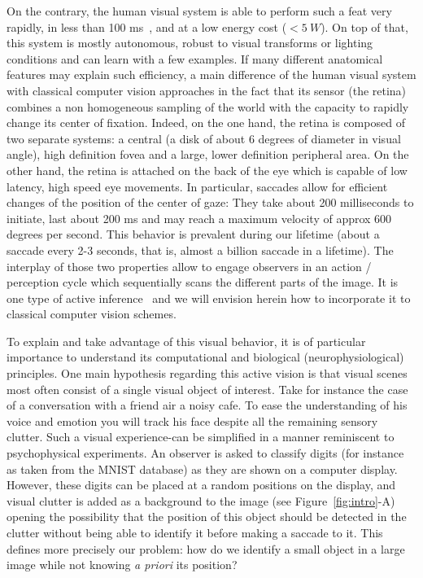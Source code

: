 On the contrary, the human visual system is able to perform such a feat very rapidly, in less than 100 ms~\citep{Kirchner06}, and at a low energy cost ($<5~W$). On top of that, this system is mostly autonomous, robust to visual transforms or lighting conditions and can learn with a few examples. If many different anatomical features may explain such efficiency, a main difference of the human visual system with classical computer vision approaches in the fact that its sensor (the retina) combines a non homogeneous sampling of the world with the capacity to rapidly change its center of fixation. Indeed, on the one hand, the retina is composed of two separate systems: a central (a disk of about 6 degrees of diameter in visual angle), high definition fovea and a large, lower definition peripheral area. On the other hand, the retina is attached on the back of the eye which is capable of low latency, high speed eye movements. In particular, saccades allow for efficient changes of the position of the center of gaze: They take about 200 milliseconds to initiate, last about 200 ms and may reach a maximum velocity of approx 600 degrees per second. This behavior is prevalent during our lifetime (about a saccade every 2-3 seconds, that is, almost a billion saccade in a lifetime). The interplay of those two properties allow to engage observers in an action / perception cycle which sequentially scans the different parts of the image. It is one type of active inference~\citep{Friston12} and we will envision herein how to incorporate it to classical computer vision schemes.

To explain and take advantage of this visual behavior, it is of particular importance to understand its computational and biological (neurophysiological) principles. One main hypothesis regarding this active vision is that visual scenes most often consist of a single visual object of interest. Take for instance the case of a conversation with a friend air a noisy cafe. To ease the understanding of his voice and emotion you will track his face despite all the remaining sensory clutter. Such a visual experience-can be simplified in a manner reminiscent to psychophysical experiments. An observer is asked to classify digits (for instance as taken from the MNIST database) as they are shown on a computer display. However, these digits can be placed at a random positions on the display, and visual clutter is added as a background to the image (see Figure~\ref{fig:intro}-A) opening the possibility that the position of this object should be detected in the clutter without being able to identify it before making a saccade to it. This defines more precisely our problem: how do we identify a small object in a large image while not knowing \emph{a priori} its position?

